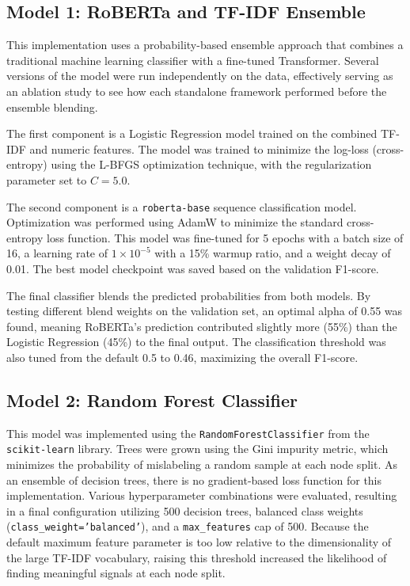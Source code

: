 \documentclass[11pt]{article}
\begin{document}
\subsection{Model 1: RoBERTa and TF-IDF Ensemble}
This implementation uses a probability-based ensemble approach that combines a traditional machine learning classifier with a fine-tuned Transformer. Several versions of the model were run independently on the data, effectively serving as an ablation study to see how each standalone framework performed before the ensemble blending.

The first component is a Logistic Regression model trained on the combined TF-IDF and numeric features. The model was trained to minimize the log-loss (cross-entropy) using the L-BFGS optimization technique, with the regularization parameter set to $C=5.0$. 

The second component is a \texttt{roberta-base} sequence classification model. Optimization was performed using AdamW to minimize the standard cross-entropy loss function. This model was fine-tuned for 5 epochs with a batch size of 16, a learning rate of $1 \times 10^{-5}$ with a 15\% warmup ratio, and a weight decay of 0.01. The best model checkpoint was saved based on the validation F1-score.

The final classifier blends the predicted probabilities from both models. By testing different blend weights on the validation set, an optimal alpha of 0.55 was found, meaning RoBERTa's prediction contributed slightly more (55\%) than the Logistic Regression (45\%) to the final output. The classification threshold was also tuned from the default 0.5 to 0.46, maximizing the overall F1-score.

\subsection{Model 2: Random Forest Classifier}
This model was implemented using the \texttt{RandomForestClassifier} from the \texttt{scikit-learn} library. Trees were grown using the Gini impurity metric, which minimizes the probability of mislabeling a random sample at each node split. As an ensemble of decision trees, there is no gradient-based loss function for this implementation. Various hyperparameter combinations were evaluated, resulting in a final configuration utilizing 500 decision trees, balanced class weights (\texttt{class\_weight='balanced'}), and a \texttt{max\_features} cap of 500. Because the default maximum feature parameter is too low relative to the dimensionality of the large TF-IDF vocabulary, raising this threshold increased the likelihood of finding meaningful signals at each node split.
\end{document}
